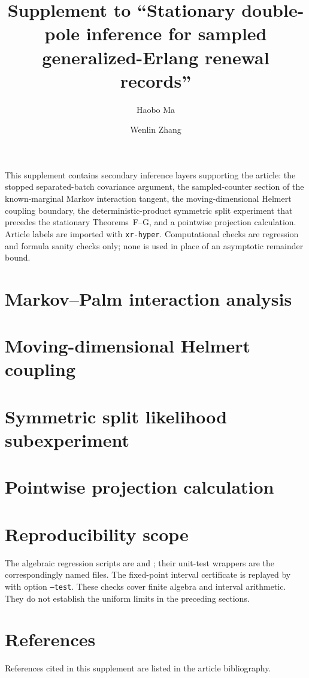 \documentclass[11pt]{article}
\title{Supplement to ``Stationary double-pole inference for sampled generalized-Erlang renewal records''}
\author{Haobo Ma \and Wenlin Zhang}
\date{}
\theoremstyle{definition}
\begin{document}
\maketitle

This supplement contains secondary inference layers supporting the article:
the stopped separated-batch covariance argument, the sampled-counter section
of the known-marginal Markov interaction tangent, the moving-dimensional
Helmert coupling boundary, the deterministic-product symmetric split
experiment that precedes the stationary Theorems~F--G, and a pointwise
projection calculation.  Article labels are imported with
\texttt{xr-hyper}.  Computational checks are regression and formula sanity
checks only; none is used in place of an asymptotic remainder bound.



\section{Markov--Palm interaction analysis}
\label{supp:markov-palm}


\section{Moving-dimensional Helmert coupling}
\label{supp:helmert-coupling}


\section{Symmetric split likelihood subexperiment}
\label{supp:singular-split}


\section{Pointwise projection calculation}
\label{supp:projection-example}


\section{Reproducibility scope}

The algebraic regression scripts are
 and
; their unit-test
wrappers are the correspondingly named  files.  The
fixed-point interval certificate is replayed by
 with option
\texttt{--test}.  These checks
cover finite algebra and interval arithmetic.  They do not establish the
uniform limits in the preceding sections.

\section*{References}
References cited in this supplement are listed in the article bibliography.
\end{document}
